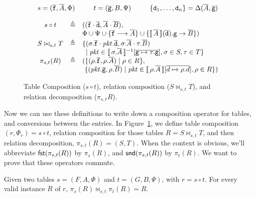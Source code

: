 \begin{figure}[tpb]
  \[\begin{array}{ccl}
      \multicolumn 3 c
      {s = (\vec{\var f},\vec A, \Phi)\hfill t = (\vec{\var g},B, \Psi) \hfill \{\var d_1, \ldots, \var d_n\} = \Delta(\vec A, \vec{\var g})}\\\\
      s \circ t
      & \triangleq
      & ((\vec{\var f}\cdot\vec{\var d}, \vec A\cdot\vec B),\\
      && \Phi \cup \Psi \cup \{\vec{\var f} \longrightarrow \vec A\} \cup \{ \bracbb{\vec A}(\vec{\var d}).\var g \to \vec B \})\\[.2em]
      S \bowtie_{s,t}T
      & \triangleq
      & \{(\sigma.\vec{\var f}\cdot\pkt.\vec{\var d},\sigma.\vec A \cdot\tau.\vec B) \\
      && \hspace{.5em}
         \mid \pkt \in \bracbb{\sigma.\vec A}^{-1}[\overline{\var g \mapsto \tau.\var g}],
         \sigma \in S, \tau \in T \} \\
      \pi_{s,t}(R)
      & \triangleq
      & (\{(\rho.\vec{\var f},\rho.\vec A) \mid \rho \in R\}, \\
      && ~\{(\pkt.\vec{\var g}, \rho.\vec B) \mid \pkt \in \bracbb{\rho.\vec A}[\overline{d\mapsto \rho.d}], \rho \in R\})
    \end{array}
  \]  
  \caption{Table Composition ($s \circ t$), relation composition
    ($S \bowtie_{s,t}T$), and relation decomposition ($\pi_{s,t}R$).}
  \label{fig:compose-tables}
\end{figure}

Now we can use these definitions to write down a composition operator
for tables, and conversions between the entries. In
Figure~\ref{fig:compose-tables}, we define table composition
$(r,\Phi_r) = s \circ t$, relation composition for those tables
$R = S \bowtie_{s,t} T$, and then relation decomposition,
$\pi_{s,t}(R) = (S,T)$. When the context is obvious, we'll abbreviate
$\mathsf{fst}(\pi_{s,t}(R))$ by $\pi_{s}(R)$, and $\mathsf{snd}(\pi_{s,t}(R))$ by
$\pi_t(R)$. We want to prove that these operators commute.

\begin{proposition}
  \label{prop:join-proj}
  Given two tables $s = (F,A,\Phi)$ and $t = (G,B, \Psi)$, with
  $r = s \circ t$. For every valid instance $R$ of $r$,
  $\pi_s(R) \bowtie_{s,t} \pi_t(R) = R$.
\end{proposition}

